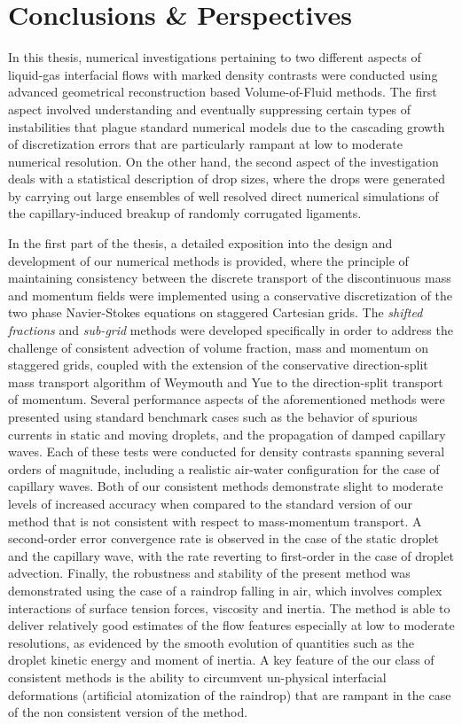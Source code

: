 \setchapterpreamble[u]{\margintoc}
\chapter{Conclusions \& Perspectives}

In this thesis, numerical investigations pertaining to two different aspects 
of liquid-gas interfacial flows with marked density contrasts were conducted 
using advanced geometrical reconstruction based Volume-of-Fluid methods. 
The first aspect involved understanding and eventually suppressing certain types of 
instabilities that plague standard numerical models due to the cascading growth of
discretization errors that are particularly rampant at low to moderate numerical resolution.  
On the other hand, the second aspect of the investigation deals with a statistical description
of drop sizes, where the drops were generated by carrying out large ensembles of well resolved 
direct numerical simulations of the capillary-induced breakup of randomly corrugated ligaments. 

In the first part of the thesis, a detailed exposition into the design and 
development of our numerical methods is provided, where the principle 
of maintaining consistency between the discrete transport of
the discontinuous mass and momentum fields were implemented  
using a conservative discretization of the two phase 
Navier-Stokes equations on staggered Cartesian grids. 
The \textit{shifted fractions} and \textit{sub-grid} methods were developed
specifically in order to address the challenge of consistent 
advection of volume fraction, mass and momentum on staggered grids,
coupled with the extension of the conservative direction-split mass transport
algorithm of Weymouth and Yue \cite{wy} to the direction-split transport of momentum.
Several performance aspects of the aforementioned methods were presented using 
standard benchmark cases such as the behavior of spurious currents in static and
moving droplets, and the propagation of damped capillary waves. 
Each of these tests were conducted for density contrasts spanning several orders of magnitude, 
including a realistic air-water configuration for the case of capillary waves. 
Both of our consistent methods demonstrate slight to moderate levels of increased accuracy
when compared to the standard version of our method that is not 
consistent with respect to mass-momentum transport. 
A second-order error convergence rate is observed in the case of the 
static droplet and the capillary wave, with the rate
reverting to first-order in the case of droplet advection.
Finally, the robustness and stability of the present method was demonstrated
using the case of a raindrop falling in air, which involves complex interactions
of surface tension forces, viscosity and inertia. The method is able to deliver
relatively good estimates of the flow features especially at low to moderate resolutions, 
as evidenced by the smooth evolution of quantities such as the droplet kinetic
energy and moment of inertia. A key feature of the our class of consistent methods 
is the ability to circumvent un-physical interfacial deformations (artificial atomization of the raindrop)
that are rampant in the case of the non consistent version of the method.
